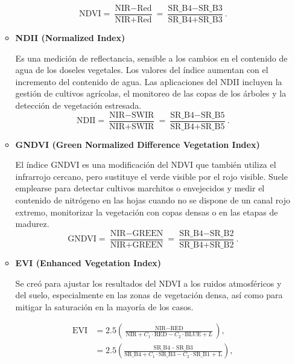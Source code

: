 \begin{itemize}
\begin{itemize}
        \[
        \text{NDVI} = \frac{\text{NIR} - \text{Red}}{\text{NIR} + \text{Red}} = \frac{\text{SR\_B4} - \text{SR\_B3}}{\text{SR\_B4} + \text{SR\_B3}}.
        \]
    
        \item \textbf{NDII (Normalized Index)} \cite{sentinel_hub_ndii}
        
        Es una medición de reflectancia, sensible a los cambios en el contenido de agua de los doseles vegetales. Los valores del índice aumentan con el incremento del contenido de agua. Las aplicaciones del NDII incluyen la gestión de cultivos agrícolas, el monitoreo de las copas de los árboles y la detección de vegetación estresada.
        \[
        \text{NDII} = \frac{\text{NIR} - \text{SWIR}}{\text{NIR} + \text{SWIR}} = \frac{\text{SR\_B4} - \text{SR\_B5}}{\text{SR\_B4} + \text{SR\_B5}}.
        \]
    
        \item \textbf{GNDVI (Green Normalized Difference Vegetation Index) } \cite{eos_indices_vegetacion}
        
        El índice GNDVI es una modificación del NDVI que también utiliza el infrarrojo cercano, pero sustituye el verde visible por el rojo visible. Suele emplearse para detectar cultivos marchitos o envejecidos y medir el contenido de nitrógeno en las hojas cuando no se dispone de un canal rojo extremo, monitorizar la vegetación con copas densas o en las etapas de madurez.
        \[
        \text{GNDVI} = \frac{\text{NIR} - \text{GREEN}}{\text{NIR} + \text{GREEN}} = \frac{\text{SR\_B4} - \text{SR\_B2}}{\text{SR\_B4} + \text{SR\_B2}}.
        \]
    
        \item \textbf{EVI (Enhanced Vegetation Index)} \cite{eos_indices_vegetacion}
        
        Se creó para ajustar los resultados del NDVI a los ruidos atmosféricos y del suelo, especialmente en las zonas de vegetación densa, así como para mitigar la saturación en la mayoría de los casos.
        
        \begin{align}
             \text{EVI} &= 2.5 \left( \frac{\text{NIR} - \text{RED}}{\text{NIR} + C_1 \cdot \text{RED} - C_2 \cdot \text{BLUE} + L} \right ), \\
             & = 2.5 \left( \frac{\text{SR\_B4 - SR\_B3}}{\text{SR\_B4} + C_1 \cdot \text{SR\_B3} - C_2 \cdot \text{SR\_B1 + L}} \right),
        \end{align}
   

\end{itemize}
\end{itemize}
